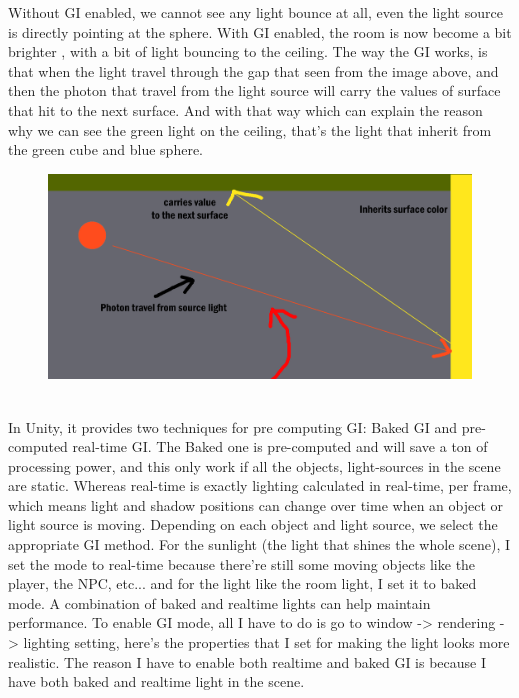\documentclass[a4paper, 13pt]{extarticle}
\begin{document}
{\begin{figure}[h]
 \end{figure}
 Without GI enabled, we cannot see any light bounce at all, even the light source is directly pointing at the sphere. With GI enabled, the room is now become a bit brighter , with a bit of light bouncing to the ceiling. The way the GI works, is that when the light travel through the gap that seen from the image above, and then the photon that travel from the light source will carry the values of surface that hit to the next surface. And with that way which can explain the reason why we can see the green light on the ceiling, that's the light that inherit from the green cube and blue sphere. 
  \begin{figure}[h]
 	\begin{minipage}{1\textwidth}
 		\centering
 		\includegraphics[width=0.8\linewidth]{intructions/How_light_works.png}
 		\centering
 	\end{minipage}
 \end{figure}
\\[0.05cm]
 In Unity, it provides two techniques for pre computing GI: Baked GI and pre-computed real-time GI. The Baked one is pre-computed and will save a ton of processing power, and this only work if all the objects, light-sources in the scene are static. Whereas real-time is exactly lighting calculated in real-time, per frame, which means light and shadow positions can change over time when an object or light source is moving. Depending on each object and light source, we select the appropriate GI method. For the sunlight (the light that shines the whole scene), I set the mode to real-time because there're still some moving objects like the player, the NPC, etc... and for the light like the room light, I set it to baked mode. A combination of baked and realtime lights can help maintain performance. To enable GI mode, all I have to do is go to window -> rendering -> lighting setting, here's the properties that I set for making the light looks more realistic. The reason I have to enable both realtime and baked GI is because I have both baked and realtime light in the scene.
}
\end{document}
